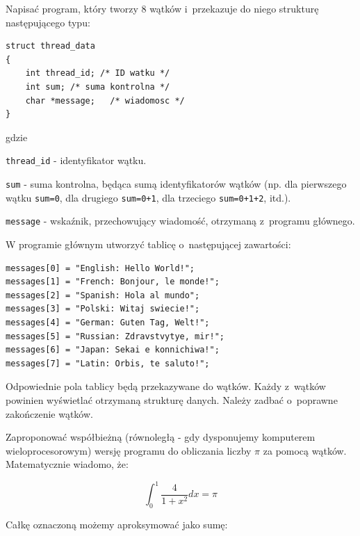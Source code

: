 \begin{myenumerate}
\item Napisać program, który tworzy $8$ wątków i~przekazuje do niego strukturę następującego typu:  

\begin{lstlisting}[style=MyCStyle]
struct thread_data 
{
	int	thread_id; /* ID watku */
	int sum; /* suma kontrolna */ 
	char *message;	 /* wiadomosc */
}
\end{lstlisting}

gdzie 

\begin{myitemize}
\item \lstinline[style=MyCStyle]{thread_id} - identyfikator wątku.
\item \lstinline[style=MyCStyle]{sum} - suma kontrolna, będąca sumą identyfikatorów wątków (np. dla pierwszego wątku \mbox{\lstinline[style=MyCStyle]{sum=0}}, dla drugiego \lstinline[style=MyCStyle]{sum=0+1}, dla trzeciego \lstinline[style=MyCStyle]{sum=0+1+2}, itd.). 
\item \lstinline[style=MyCStyle]{message} - wskaźnik, przechowujący wiadomość, otrzymaną z~programu głównego.   
\end{myitemize}

W programie głównym utworzyć tablicę o~następującej zawartości: 

\begin{lstlisting}[style=MyCStyle]
messages[0] = "English: Hello World!";
messages[1] = "French: Bonjour, le monde!";
messages[2] = "Spanish: Hola al mundo";
messages[3] = "Polski: Witaj swiecie!";
messages[4] = "German: Guten Tag, Welt!"; 
messages[5] = "Russian: Zdravstvytye, mir!";
messages[6] = "Japan: Sekai e konnichiwa!";
messages[7] = "Latin: Orbis, te saluto!";
\end{lstlisting}

Odpowiednie pola tablicy będą przekazywane do wątków. Każdy z~wątków powinien wyświetlać otrzymaną strukturę danych. Należy zadbać o~poprawne zakończenie wątków. 

\item Zaproponować współbieżną (równoległą - gdy dysponujemy komputerem wieloprocesorowym) wersję programu do obliczania liczby $\pi$ za pomocą wątków. Matematycznie wiadomo, że:

\begin{equation}\nonumber 
\displaystyle\int_0^1{\frac{4}{1+x^2}dx}=\pi
\end{equation}

Całkę oznaczoną możemy aproksymować jako sumę:


\end{myenumerate}
